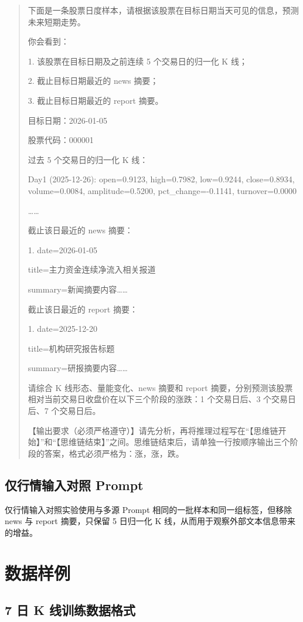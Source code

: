 \begin{quote}\small
下面是一条股票日度样本，请根据该股票在目标日期当天可见的信息，预测未来短期走势。

你会看到：

1. 该股票在目标日期及之前连续 5 个交易日的归一化 K 线；

2. 截止目标日期最近的 news 摘要；

3. 截止目标日期最近的 report 摘要。

目标日期：2026-01-05

股票代码：000001

过去 5 个交易日的归一化 K 线：

Day1 (2025-12-26): open=0.9123, high=0.7982, low=0.9244, close=0.8934, volume=0.0084, amplitude=0.5200, pct\_change=-0.1141, turnover=0.0000

……

截止该日最近的 news 摘要：

1. date=2026-01-05

title=主力资金连续净流入相关报道

summary=新闻摘要内容……

截止该日最近的 report 摘要：

1. date=2025-12-20

title=机构研究报告标题

summary=研报摘要内容……

请综合 K 线形态、量能变化、news 摘要和 report 摘要，分别预测该股票相对当前交易日收盘价在以下三个阶段的涨跌：1 个交易日后、3 个交易日后、7 个交易日后。

【输出要求（必须严格遵守）】请先分析，再将推理过程写在“【思维链开始】”和“【思维链结束】”之间。思维链结束后，请单独一行按顺序输出三个阶段的答案，格式必须严格为：涨，涨，跌。
\end{quote}

\section{仅行情输入对照 Prompt}

仅行情输入对照实验使用与多源 Prompt 相同的一批样本和同一组标签，但移除 news 与 report 摘要，只保留 5 日归一化 K 线，从而用于观察外部文本信息带来的增益。

\chapter{数据样例}

\section{7 日 K 线训练数据格式}

